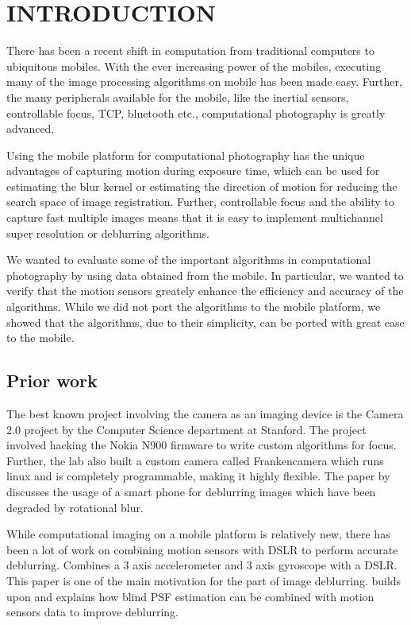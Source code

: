 \documentclass[BTech]{iitmdiss}
\begin{document}
\pagebreak


\chapter{INTRODUCTION}
\label{chap:intro}
There has been a recent shift in computation from traditional computers
to ubiquitous mobiles. With the ever increasing power of the mobiles, 
executing many of the image processing algorithms on mobile has been 
made easy. Further, the many peripherals available for the mobile, like
the inertial sensors, controllable focus, TCP, bluetooth etc., 
computational photography is greatly advanced. 

Using the mobile platform for computational photography has the unique
advantages of capturing motion during exposure time, which can be used
for estimating the blur kernel or estimating the direction of motion
for reducing the search space of image registration. Further, 
controllable focus and the ability to capture fast multiple images means
that it is easy to implement multichannel super resolution or deblurring
algorithms. 

We wanted to evaluate some of the important algorithms in computational
photography by using data obtained from the mobile. In particular, we 
wanted to verify that the motion sensors greately enhance the efficiency
and accuracy of the algorithms. While we did not port the algorithms to
the mobile platform, we showed that the algorithms, due to their simplicity,
can be ported with great ease to the mobile. 

\section{Prior work}
\label{intro:prior_work}
The best known project involving the camera as an imaging device is the 
Camera 2.0 project by the Computer Science department at Stanford. The
project involved hacking the Nokia N900 firmware to write custom algorithms
for focus. Further, the lab also built a custom camera called Frankencamera
which runs linux and is completely programmable, making it highly flexible.
The paper by \cite{vsindelavr2013image} discusses the usage of a smart
phone for deblurring images which have been degraded by rotational blur.

While computational imaging on a mobile platform is relatively new, there
has been a lot of work on combining motion sensors with DSLR to perform
accurate deblurring. \cite{joshi2010image} Combines a 3 axis accelerometer
and 3 axis gyroscope with a DSLR. This paper is one of the main motivation
for the part of image deblurring. \cite{bae2013accurate} builds upon
\cite{joshi2010image} and explains how blind PSF estimation can be
combined with motion sensors data to improve deblurring. 
\end{document}
